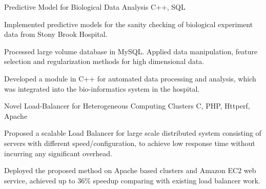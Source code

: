 \begin{cventries}

\projentry
{Predictive Model for Biological Data Analysis} %
{C++, SQL} %
{ %
\begin{cvitems}
\item{Implemented predictive models for the sanity checking of biological experiment data from Stony Brook Hospital.}
\item{Processed large volume database in MySQL. Applied data manipulation, feature selection and regularization methods for high dimensional data.}
\item{Developed a module in C++ for automated data processing and analysis, which was integrated into the bio-informatics system in the hospital.}
\end{cvitems}
}


\projentry
{Novel Load-Balancer for Heterogeneous Computing Clusters} %
{C, PHP, Httperf, Apache} %
{ %
\begin{cvitems}
\item{Proposed a scalable Load Balancer for large scale distributed system consisting of servers with different speed/configuration, to achieve low response time without incurring any significant overhead.}
\item{Deployed the proposed method on Apache based clusters and Amazon EC2 web service, achieved up to 36\% speedup comparing with existing load balancer work.}
\end{cvitems}
}




\end{cventries}
